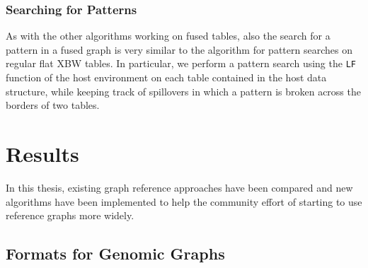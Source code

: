 \documentclass[a4paper,12pt,twoside,BCOR=10mm]{scrbook}
\begin{document}

\subsection{Searching for Patterns}

As with the other algorithms working on fused tables, also the search for a pattern 
in a fused graph is very similar to the algorithm for pattern searches on regular flat XBW tables. 
In particular, we perform a pattern search using the \texttt{LF} function of the host environment on each table contained 
in the host data structure, while keeping track of spillovers in which a pattern is broken 
across the borders of two tables.


\chapter{Results}
%

In this thesis, existing graph reference approaches have been compared 
and new algorithms have been implemented to help the community effort 
of starting to use reference graphs more widely.

\section{Formats for Genomic Graphs}
\label{sec:results_data_formats}
%
\end{document}
